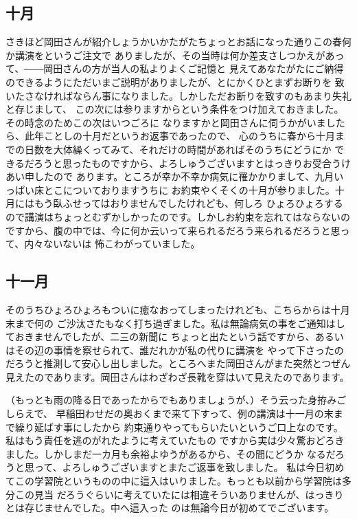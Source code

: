 \subsection{十月}
さきほど岡田さんが紹介しょうかいかたがたちょっとお話になった通りこの春何か講演をというご注文で
ありましたが、その当時は何か差支さしつかえがあって、――岡田さんの方が当人の私よりよくご記憶と
見えてあなたがたにご納得のできるようにただいまご説明がありましたが、とにかくひとまずお断りを
致いたさなければならん事になりました。しかしただお断りを致すのもあまり失礼と存じまして、
この次には参りますからという条件をつけ加えておきました。その時念のためこの次はいつごろに
なりますかと岡田さんに伺うかがいましたら、此年ことしの十月だというお返事であったので、
心のうちに春から十月までの日数を大体繰くってみて、それだけの時間があればそのうちにどうにか
できるだろうと思ったものですから、よろしゅうございますとはっきりお受合うけあい申したので
あります。ところが幸か不幸か病気に罹かかりまして、九月いっぱい床とこについておりますうちに
お約束やくそくの十月が参りました。十月にはもう臥ふせってはおりませんでしたけれども、何しろ
ひょろひょろするので講演はちょっとむずかしかったのです。しかしお約束を忘れてはならないの
ですから、腹の中では、今に何か云いって来られるだろう来られるだろうと思って、内々ないないは
怖こわがっていました。

\subsection{十一月}
そのうちひょろひょろもついに癒なおってしまったけれども、こちらからは十月末まで何の
ご沙汰さたもなく打ち過ぎました。私は無論病気の事をご通知はしておきませんでしたが、二三の新聞に
ちょっと出たという話ですから、あるいはその辺の事情を察せられて、誰だれかが私の代りに講演を
やって下さったのだろうと推測して安心し出しました。ところへまた岡田さんがまた突然とつぜん
見えたのであります。岡田さんはわざわざ長靴を穿はいて見えたのであります。

（もっとも雨の降る日であったからでもありましょうが、）そう云った身拵みごしらえで、
早稲田わせだの奥おくまで来て下すって、例の講演は十一月の末まで繰り延ばす事にしたから
約束通りやってもらいたいというご口上なのです。私はもう責任を逃のがれたように考えていたもの
ですから実は少々驚おどろきました。しかしまだ一カ月も余裕よゆうがあるから、その間にどうか
なるだろうと思って、よろしゅうございますとまたご返事を致しました。
私は今日初めてこの学習院というものの中に這入はいりました。もっとも以前から学習院は多分この見当
だろうぐらいに考えていたには相違そういありませんが、はっきりとは存じませんでした。中へ這入った
のは無論今日が初めてでございます。


